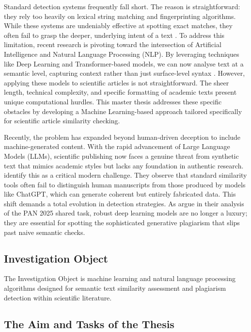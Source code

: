 \documentclass[12pt, a4paper]{article}
\begin{document}
Standard detection systems frequently fall short. The reason is straightforward: they rely too heavily on lexical string matching and fingerprinting algorithms. While these systems are undeniably effective at spotting exact matches, they often fail to grasp the deeper, underlying intent of a text \citep{ElRashidy2022}. To address this limitation, recent research is pivoting toward the intersection of Artificial Intelligence and Natural Language Processing (NLP). By leveraging techniques like Deep Learning and Transformer-based models, we can now analyse text at a semantic level, capturing context rather than just surface-level syntax \citep{LiuZhu2023}. However, applying these models to scientific articles is not straightforward. The sheer length, technical complexity, and specific formatting of academic texts present unique computational hurdles. This master thesis addresses these specific obstacles by developing a Machine Learning-based approach tailored specifically for scientific article similarity checking.

Recently, the problem has expanded beyond human-driven deception to include machine-generated content. With the rapid advancement of Large Language Models (LLMs), scientific publishing now faces a genuine threat from synthetic text that mimics academic styles but lacks any foundation in authentic research. \citet{Alhijawi2025} identify this as a critical modern challenge. They observe that standard similarity tools often fail to distinguish human manuscripts from those produced by models like ChatGPT, which can generate coherent but entirely fabricated data. This shift demands a total evolution in detection strategies. As \citet{GreinerPetter2025} argue in their analysis of the PAN 2025 shared task, robust deep learning models are no longer a luxury; they are essential for spotting the sophisticated generative plagiarism that slips past naive semantic checks.

\subsection{Investigation Object}

The Investigation Object is machine learning and natural language processing algorithms designed for semantic text similarity assessment and plagiarism detection within scientific literature.

\subsection{The Aim and Tasks of the Thesis}
\end{document}
